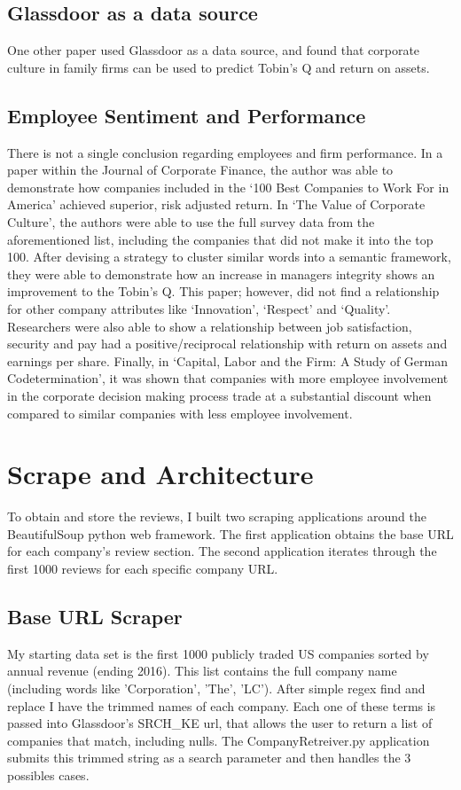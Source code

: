 \documentclass[conference, letterpaper]{IEEEtran}
\begin{document}
\subsection{Glassdoor as a data source}
One other paper used Glassdoor as a data source\cite{huang2015family}, and found that corporate culture in family firms can be used to predict Tobin's Q and return on assets.

\subsection{Employee Sentiment and Performance}
There is not a single conclusion regarding employees and firm performance. 
In a paper within the Journal of Corporate Finance, the author was able to demonstrate how companies included in the `100 Best Companies to Work For in America' achieved superior, risk adjusted return.\cite{edmans}
In `The Value of Corporate Culture',\cite{guiso2015value} the authors were able to use the full survey data from the aforementioned list, including the companies that did not make it into the top 100.
After devising a strategy to cluster similar words into a semantic framework, they were able to demonstrate how an increase in managers integrity shows an improvement to the Tobin's Q.
This paper; however, did not find a relationship for other company attributes like `Innovation', `Respect' and `Quality'.\\

Researchers\cite{schneider2003comes} were also able to show a relationship between job satisfaction, security and pay had a positive/reciprocal relationship with return on assets and earnings per share.
Finally, in `Capital, Labor and the Firm: A Study of German Codetermination'\cite{gorton2004capital}, it was shown that companies with more employee involvement in the corporate decision making process trade at a substantial discount when compared to similar companies with less employee involvement.

\section{Scrape and Architecture}
To obtain and store the reviews, I built two scraping applications around the BeautifulSoup python web framework.
The first application obtains the base URL for each company's review section.
The second application iterates through the first 1000 reviews for each specific company URL.

\subsection{Base URL Scraper}
My starting data set is the first 1000 publicly traded US companies sorted by annual revenue (ending 2016).  
This list contains the full company name (including words like 'Corporation', 'The', 'LC').
After simple regex find and replace I have the trimmed names of each company.
Each one of these terms is passed into Glassdoor's SRCH\_KE url, that allows the user to return a list of companies that match, including nulls.
The CompanyRetreiver.py application submits this trimmed string as a search parameter and then handles the 3 possibles cases.
\end{document}
